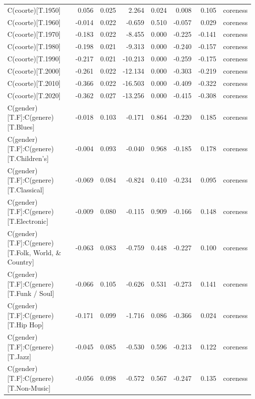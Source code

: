 \begin{table}
\begin{tabular}{lrrrrrrl}
                                 C(coorte)[T.1950] &  0.056 & 0.025 &   2.264 & 0.024 &  0.008 &  0.105 & coreness \\
                                 C(coorte)[T.1960] & -0.014 & 0.022 &  -0.659 & 0.510 & -0.057 &  0.029 & coreness \\
                                 C(coorte)[T.1970] & -0.183 & 0.022 &  -8.455 & 0.000 & -0.225 & -0.141 & coreness \\
                                 C(coorte)[T.1980] & -0.198 & 0.021 &  -9.313 & 0.000 & -0.240 & -0.157 & coreness \\
                                 C(coorte)[T.1990] & -0.217 & 0.021 & -10.213 & 0.000 & -0.259 & -0.175 & coreness \\
                                 C(coorte)[T.2000] & -0.261 & 0.022 & -12.134 & 0.000 & -0.303 & -0.219 & coreness \\
                                 C(coorte)[T.2010] & -0.366 & 0.022 & -16.503 & 0.000 & -0.409 & -0.322 & coreness \\
                                 C(coorte)[T.2020] & -0.362 & 0.027 & -13.256 & 0.000 & -0.415 & -0.308 & coreness \\
                 C(gender)[T.F]:C(genere)[T.Blues] & -0.018 & 0.103 &  -0.171 & 0.864 & -0.220 &  0.185 & coreness \\
            C(gender)[T.F]:C(genere)[T.Children's] & -0.004 & 0.093 &  -0.040 & 0.968 & -0.185 &  0.178 & coreness \\
             C(gender)[T.F]:C(genere)[T.Classical] & -0.069 & 0.084 &  -0.824 & 0.410 & -0.234 &  0.095 & coreness \\
            C(gender)[T.F]:C(genere)[T.Electronic] & -0.009 & 0.080 &  -0.115 & 0.909 & -0.166 &  0.148 & coreness \\
C(gender)[T.F]:C(genere)[T.Folk, World, \& Country] & -0.063 & 0.083 &  -0.759 & 0.448 & -0.227 &  0.100 & coreness \\
           C(gender)[T.F]:C(genere)[T.Funk / Soul] & -0.066 & 0.105 &  -0.626 & 0.531 & -0.273 &  0.141 & coreness \\
               C(gender)[T.F]:C(genere)[T.Hip Hop] & -0.171 & 0.099 &  -1.716 & 0.086 & -0.366 &  0.024 & coreness \\
                  C(gender)[T.F]:C(genere)[T.Jazz] & -0.045 & 0.085 &  -0.530 & 0.596 & -0.213 &  0.122 & coreness \\
             C(gender)[T.F]:C(genere)[T.Non-Music] & -0.056 & 0.098 &  -0.572 & 0.567 & -0.247 &  0.135 & coreness \\

\end{tabular}
\end{table}
